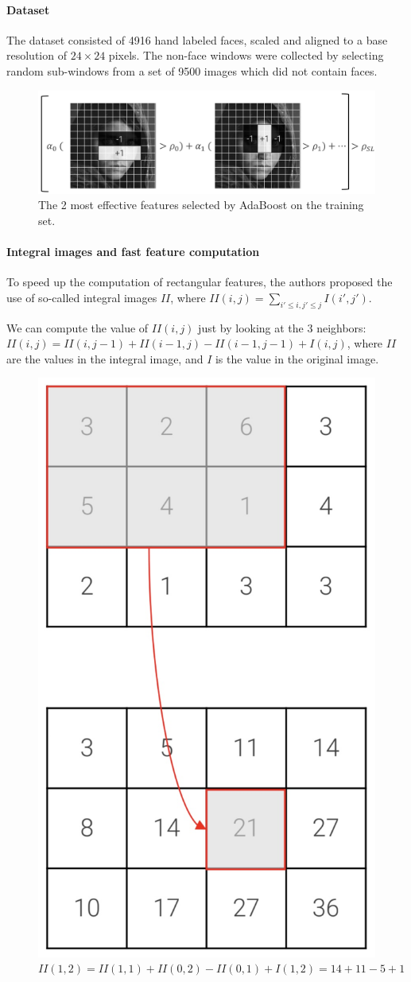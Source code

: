 \paragraph{Dataset}
The dataset consisted of 4916 hand labeled faces, scaled and aligned to a base resolution of $24 \times 24$ pixels.
The non-face windows were collected by selecting random sub-windows from a set of 9500 images which did not contain faces.

\begin{figure}[htbp]
  \centering
  \includegraphics[width=0.6\linewidth]{./img/adaboost.png}
  \caption{The 2 most effective features selected by AdaBoost on the training set.}
\end{figure}

\paragraph{Integral images and fast feature computation}
To speed up the computation of rectangular features, the authors proposed the use of so-called integral images $II$, where $II(i,j) = \sum_{i' \leq i, j' \leq j} I(i', j')$.

We can compute the value of $II(i,j)$ just by looking at the 3 neighbors: $II(i,j) = II(i, j-1) + II(i-1, j) - II(i-1, j-1) + I(i,j)$, where $II$ are the values in the integral image, and $I$ is the value in the original image.

\begin{figure}[htbp]
  \centering
  \includegraphics[width=0.6\linewidth]{./img/integral_images.jpg}
  \caption{$II(1,2) = II(1,1) + II(0,2) - II(0,1) + I(1,2) = 14 + 11 - 5 + 1$}
\end{figure}

